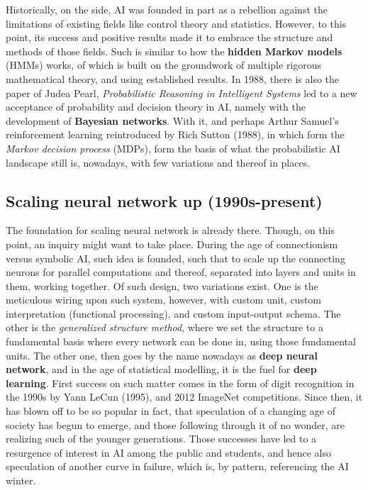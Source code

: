 Historically, on the side, AI was founded in part as a rebellion against the limitations of existing fields like control theory and statistics. However, to this point, its success and positive results made it to embrace the structure and methods of those fields. Such is similar to how the \textbf{hidden Markov models} (HMMs) works, of which is built on the groundwork of multiple rigorous mathematical theory, and using established results. In 1988, there is also the paper of Judea Pearl, \textit{Probabilistic Reasoning in Intelligent Systems} led to a new acceptance of probability and decision theory in AI, namely with the development of \textbf{Bayesian networks}. With it, and perhaps Arthur Samuel's reinforcement learning reintroduced by Rich Sutton (1988), in which form the \textit{Markov decision process} (MDPs), form the basis of what the probabilistic AI landscape still is, nowadays, with few variations and thereof in places. 

\subsection{Scaling neural network up (1990s-present)}

The foundation for scaling neural network is already there. Though, on this point, an inquiry might want to take place. During the age of connectionism versus symbolic AI, such idea is founded, such that to scale up the connecting neurons for parallel computations and thereof, separated into layers and units in them, working together. Of such design, two variations exist. One is the meticulous wiring upon such system, however, with custom unit, custom interpretation (functional processing), and custom input-output schema. The other is the \textit{generalized structure method}, where we set the structure to a fundamental basis where every network can be done in, using those fundamental units. The other one, then goes by the name nowadays as \textbf{deep neural network}, and in the age of statistical modelling, it is the fuel for \textbf{deep learning}. First success on such matter comes in the form of digit recognition in the 1990s by Yann LeCun (1995), and 2012 ImageNet competitions. Since then, it has blown off to be so popular in fact, that speculation of a changing age of society has begun to emerge, and those following through it of no wonder, are realizing such of the younger generations. Those successes have led to a resurgence of interest in AI among the public and students, and hence also speculation of another curve in failure, which is, by pattern, referencing the AI winter. 

